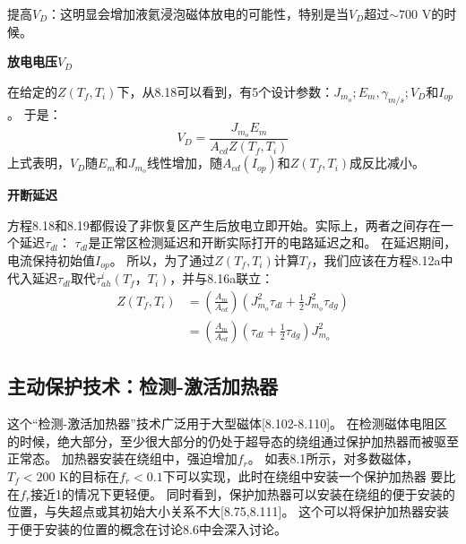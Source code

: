 提高$V_D$：这明显会增加液氦浸泡磁体放电的可能性，特别是当$V_D$超过$\sim 700$ V的时候。

\textbf{放电电压$V_D$}

在给定的$Z(T_f,T_i)$下，从8.18可以看到，有5个设计参数：$J_{m_o};E_m,\gamma_{m/s};V_D$和$I_{op}$。
于是：
\begin{equation}%
V_D=\frac{J_{m_o}E_m}{A_{cd}Z(T_f,T_i)}
\end{equation}
上式表明，$V_D$随$E_m$和$J_{m_o}$线性增加，随$A_{cd}(I_{op})$和$Z(T_f,T_i)$成反比减小。

\textbf{开断延迟}

方程8.18和8.19都假设了非恢复区产生后放电立即开始。实际上，两者之间存在一个延迟$\tau_{dl}$：
$\tau_{dl}$是正常区检测延迟和开断实际打开的电路延迟之和。
在延迟期间，电流保持初始值$I_{op}$。
所以，为了通过$Z(T_f,T_i)$计算$T_f$，我们应该在方程8.12a中代入延迟$\tau_{dl}$取代$\tau_{ah}^i(T_f，T_i)$，并与8.16a联立：
\begin{subequations}
	\begin{align}
Z(T_f,T_i)&=\left(\frac{A_m}{A_{cd}}\right)(J_{m_o}^{2}\tau_{dl}+\frac{1}{2}J_{m_o}^{2}\tau_{dg})\\
&=\left(\frac{A_m}{A_{cd}}\right)(\tau_{dl}+\frac{1}{2}\tau_{dg})J_{m_o}^{2}
	\end{align}
\end{subequations}

\subsection{主动保护技术：检测-激活加热器}
这个“检测-激活加热器”技术广泛用于大型磁体[8.102-8.110]。
在检测磁体电阻区的时候，绝大部分，至少很大部分的仍处于超导态的绕组通过保护加热器而被驱至正常态。
加热器安装在绕组中，强迫增加$f_r$。
如表8.1所示，对多数磁体，$T_f<200$ K的目标在$f_r<0.1$下可以实现，此时在绕组中安装一个保护加热器
要比在$f_r$接近1的情况下更轻便。
同时看到，保护加热器可以安装在绕组的便于安装的位置，与失超点或其初始大小关系不大[8.75,8.111]。
这个可以将保护加热器安装于便于安装的位置的概念在讨论8.6中会深入讨论。

